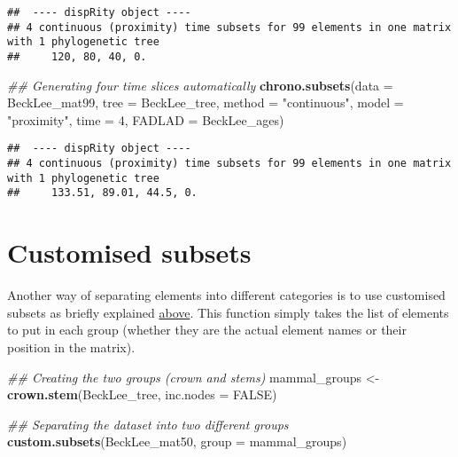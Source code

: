\documentclass[
]{book}
\newenvironment{Shaded}{\begin{snugshade}}{\end{snugshade}}
\newcommand{\CommentTok}[1]{\textcolor[rgb]{0.56,0.35,0.01}{\textit{#1}}}
\newcommand{\DataTypeTok}[1]{\textcolor[rgb]{0.13,0.29,0.53}{#1}}
\newcommand{\DecValTok}[1]{\textcolor[rgb]{0.00,0.00,0.81}{#1}}
\newcommand{\KeywordTok}[1]{\textcolor[rgb]{0.13,0.29,0.53}{\textbf{#1}}}
\newcommand{\NormalTok}[1]{#1}
\newcommand{\OtherTok}[1]{\textcolor[rgb]{0.56,0.35,0.01}{#1}}
\newcommand{\StringTok}[1]{\textcolor[rgb]{0.31,0.60,0.02}{#1}}
\begin{document}
\begin{verbatim}
##  ---- dispRity object ---- 
## 4 continuous (proximity) time subsets for 99 elements in one matrix with 1 phylogenetic tree
##     120, 80, 40, 0.
\end{verbatim}

\begin{Shaded}
\begin{Highlighting}[]
\CommentTok{\#\# Generating four time slices automatically}
\KeywordTok{chrono.subsets}\NormalTok{(}\DataTypeTok{data =}\NormalTok{ BeckLee\_mat99, }\DataTypeTok{tree =}\NormalTok{ BeckLee\_tree,}
               \DataTypeTok{method =} \StringTok{"continuous"}\NormalTok{, }\DataTypeTok{model =} \StringTok{"proximity"}\NormalTok{,}
               \DataTypeTok{time =} \DecValTok{4}\NormalTok{, }\DataTypeTok{FADLAD =}\NormalTok{ BeckLee\_ages)}
\end{Highlighting}
\end{Shaded}

\begin{verbatim}
##  ---- dispRity object ---- 
## 4 continuous (proximity) time subsets for 99 elements in one matrix with 1 phylogenetic tree
##     133.51, 89.01, 44.5, 0.
\end{verbatim}

\hypertarget{custom-subsets}{%
\section{Customised subsets}\label{custom-subsets}}

Another way of separating elements into different categories is to use customised subsets as briefly explained \protect\hyperlink{disparity-among-groups}{above}.
This function simply takes the list of elements to put in each group (whether they are the actual element names or their position in the matrix).

\begin{Shaded}
\begin{Highlighting}[]
\CommentTok{\#\# Creating the two groups (crown and stems)}
\NormalTok{mammal\_groups \textless{}{-}}\StringTok{ }\KeywordTok{crown.stem}\NormalTok{(BeckLee\_tree, }\DataTypeTok{inc.nodes =} \OtherTok{FALSE}\NormalTok{)}

\CommentTok{\#\# Separating the dataset into two different groups}
\KeywordTok{custom.subsets}\NormalTok{(BeckLee\_mat50, }\DataTypeTok{group =}\NormalTok{ mammal\_groups)}
\end{Highlighting}
\end{Shaded}
\end{document}

